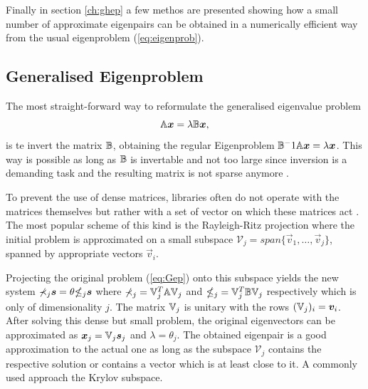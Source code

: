 Finally in section \ref{ch:ghep} a few methos are presented showing how a small number of approximate eigenpairs can be obtained in a numerically efficient way from the usual eigenproblem (\ref{eq:eigenprob}).

%

\subsection{Generalised Eigenproblem}
\label{ch:GenEV}
The most straight-forward way to reformulate the generalised eigenvalue problem
\begin{equation} \label{eq:Gep}
\mathbb{A}\bm{x}=\lambda\mathbb{B}\bm{x},
\end{equation}
is te invert the matrix $\mathbb{B}$, obtaining the regular Eigenproblem $\mathbb{B}^-1\mathbb{A}\bm{x}=\lambda\bm{x}$.
This way is possible as long as $\mathbb{B}$ is invertable and not too large since inversion is a demanding task and the resulting matrix is not sparse anymore \cite{slepcManual}.

To prevent the use of dense matrices, libraries often do not operate with the matrices themselves but rather with a set of vector on which these matrices act \cite{slepcManual}.
The most popular scheme of this kind is the Rayleigh-Ritz projection where the initial problem is approximated on a small subspace $\mathcal{V}_j=span \{\vec{v}_1,\hdots,\vec{v}_j\}$, spanned by appropriate vectors $\vec{v}_i$.

Projecting the original problem (\ref{eq:Gep}) onto this subspace yields the new system $\mathbb{\Sigma}_j \bm{s}=\theta\mathbb{\Theta}_j\bm{s}$ where $\mathbb{\Sigma}_j=\mathbb{V}_j^T\mathbb{A}\mathbb{V}_j$ and $\mathbb{\Theta}_j=\mathbb{V}_j^T\mathbb{B}\mathbb{V}_j$ respectively which is only of dimensionality $j$.
The matrix $\mathbb{V}_j$ is unitary with the rows $(\mathbb{V}_j)_i=\bm{v}_i$.
After solving this dense but small problem, the original eigenvectors can be approximated as $\bm{x}_j=\mathbb{V}_j\bm{s}_j$ and $\lambda=\theta_j$.
The obtained eigenpair is a good approximation to the actual one as long as the subspace $\mathcal{V}_j$ contains the respective solution or contains a vector which is at least close to it.
A commonly used approach the Krylov subspace.

